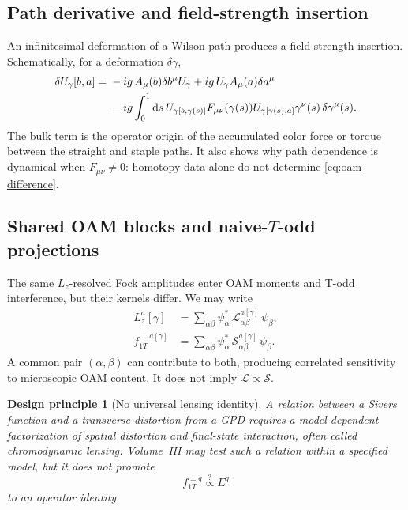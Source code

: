 \documentclass[11pt]{article}
\newtheorem{principle}[definition]{Design principle}
\newcommand{\dd}{\mathrm{d}}
\newcommand{\cS}{\mathcal S}
\newcommand{\cL}{\mathcal L}
\begin{document}
\subsection{Path derivative and field-strength insertion}

An infinitesimal deformation of a Wilson path produces a field-strength
insertion.  Schematically, for a deformation \(\delta\gamma\),
\begin{align}
 \delta U_\gamma[b,a]
 ={}&-ig\,A_\mu(b)\delta b^\mu U_\gamma
 +ig\,U_\gamma A_\mu(a)\delta a^\mu
\notag\\
 &-ig\int_0^1\dd s\,
 U_{\gamma[b,\gamma(s)]}
 F_{\mu\nu}(\gamma(s))
 U_{\gamma[\gamma(s),a]}
 \dot\gamma^\nu(s)\,\delta\gamma^\mu(s).
\label{eq:path-derivative-field-strength}
\end{align}
The bulk term is the operator origin of the accumulated color force or torque
between the straight and staple paths.  It also shows why path dependence is
dynamical when \(F_{\mu\nu}\ne0\): homotopy data alone do not determine
\cref{eq:oam-difference}.

\subsection{Shared OAM blocks and naive-\texorpdfstring{\(T\)}{T}-odd projections}

The same \(L_z\)-resolved Fock amplitudes enter OAM moments and T-odd
interference, but their kernels differ.  We may write
\begin{align}
 L_z^a[\gamma]
 &=\sum_{\alpha\beta}
   \psi_\alpha^*\,
   \cL_{\alpha\beta}^{a[\gamma]}\,
   \psi_\beta,
\label{eq:oam-kernel}\\
 f_{1T}^{\perp a[\gamma]}
 &=\sum_{\alpha\beta}
   \psi_\alpha^*\,
   \cS_{\alpha\beta}^{a[\gamma]}\,
   \psi_\beta.
\label{eq:sivers-kernel}
\end{align}
A common pair \((\alpha,\beta)\) can contribute to both, producing correlated
sensitivity to microscopic OAM content.  It does not imply
\(\cL\propto\cS\).

\begin{principle}[No universal lensing identity]
\label{pr:no-universal-lensing}
A relation between a Sivers function and a transverse distortion from a GPD
requires a model-dependent factorization of spatial distortion and final-state
interaction, often called chromodynamic lensing.  Volume~III may test such a
relation within a specified model, but it does not promote
\begin{equation}
 f_{1T}^{\perp q}\overset{?}{\propto} E^q
\label{eq:forbidden-universal-lensing}
\end{equation}
to an operator identity.
\end{principle}
\end{document}
